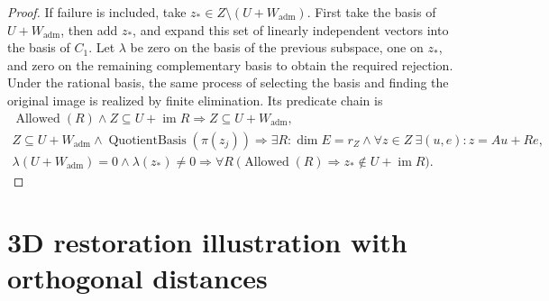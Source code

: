 \documentclass[12pt,a4paper,openany,notitlepage]{report}
\theoremstyle{plain}
\theoremstyle{definition}
\theoremstyle{remark}
\begin{document}
\begin{CJK*}
\begin{proof}
If failure is included, take $z_*\in Z\setminus(U+W_{\mathrm{adm}})$. First take the basis of $U+W_{\mathrm{adm}}$, then add $z_*$, and expand this set of linearly independent vectors into the basis of $C_1$. Let $\lambda$ be zero on the basis of the previous subspace, one on $z_*$, and zero on the remaining complementary basis to obtain the required rejection. Under the rational basis, the same process of selecting the basis and finding the original image is realized by finite elimination. Its predicate chain is \[
 \begin{gathered}
 \operatorname{Allowed}(R)\land
 Z\subseteq U+\operatorname{im}R
 \Rightarrow Z\subseteq U+W_{\mathrm{adm}},\\
 Z\subseteq U+W_{\mathrm{adm}}
 \land\operatorname{QuotientBasis}(\pi(z_j))
 \Rightarrow\exists R:\dim E=r_Z
 \land\forall z\in Z\ \exists(u,e):z=Au+Re,\\
 \lambda(U+W_{\mathrm{adm}})=0\land\lambda(z_*)\ne0
 \Rightarrow
 \forall R\ \bigl(\operatorname{Allowed}(R)
       \Rightarrow z_*\notin U+\operatorname{im}R\bigr).
 \end{gathered}
\]\end{proof}


\section { 3D restoration illustration with orthogonal distances }\label{hgov:three-dimensional}



\end{CJK*}
\end{document}
